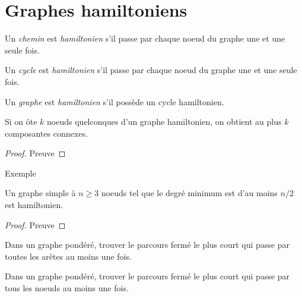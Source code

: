 \section{Graphes hamiltoniens}
\begin{mydef}
  Un \emph{chemin} est \emph{hamiltonien} s’il passe par chaque noeud du graphe une et une seule fois.
\end{mydef}

\begin{mydef}
  Un \emph{cycle} est \emph{hamiltonien} s’il passe par chaque noeud du graphe une et une seule fois.
\end{mydef}

\begin{mydef}
  Un \emph{graphe} est \emph{hamiltonien} s’il possède un cycle hamiltonien.
\end{mydef}

\begin{mytheo}  
  Si on ôte $k$ noeuds quelconques d’un graphe hamiltonien, on obtient au plus $k$ composantes connexes.
  \begin{proof}
     Preuve
  \end{proof}
\end{mytheo}
\begin{myexem}
  Exemple
\end{myexem}

\begin{mytheo}  
  Un graphe simple à $n \geq 3$ noeuds tel que le degré minimum est d’au moins $n/2$ est hamiltonien.
  \begin{proof}
     Preuve
  \end{proof}
\end{mytheo}

\begin{mydef} 
  Dans un graphe pondéré, trouver le parcours fermé le plus court qui passe par toutes les arêtes au moins une fois.
\end{mydef}

\begin{mydef} 
  Dans un graphe pondéré, trouver le parcours fermé le plus court qui passe par tous les noeuds au moins une fois.
\end{mydef}
